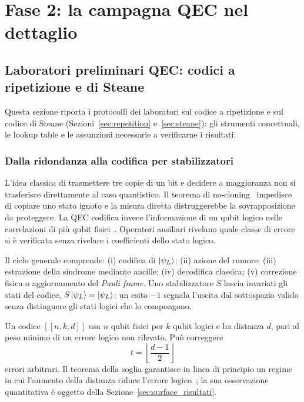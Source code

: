 \chapter{Fase 2: la campagna QEC nel dettaglio}
\captionsetup[figure]{font=small,labelfont=bf}
\label{app:fase2}

\section{Laboratori preliminari QEC: codici a ripetizione e di Steane}
\label{app:laboratori_qec}
\begin{onehalfspace}

Questa sezione riporta i protocolli dei laboratori sul codice a ripetizione e
sul codice di Steane (Sezioni~\ref{sec:repetition} e~\ref{sec:steane}): gli
strumenti concettuali, le lookup table e le assunzioni necessarie a verificarne
i risultati.

\subsection{Dalla ridondanza alla codifica per stabilizzatori}
\label{app:qec_richiami}

L'idea classica di trasmettere tre copie di un bit e decidere a maggioranza
non si trasferisce direttamente al caso quantistico. Il teorema di
no-cloning~\cite{wootters1982} impedisce di copiare uno stato ignoto e la
misura diretta distruggerebbe la sovrapposizione da proteggere. La
\ac{QEC} codifica invece l'informazione di un qubit logico nelle
correlazioni di più qubit fisici~\cite{shorcorrection1995,steane1996,roffe2019}.
Operatori ausiliari rivelano quale classe di errore si è verificata senza
rivelare i coefficienti dello stato logico.

Il ciclo generale comprende: (i) codifica di $\ket{\psi_L}$; (ii) azione
del rumore; (iii) estrazione della sindrome mediante ancille; (iv)
decodifica classica; (v) correzione fisica o aggiornamento del \emph{Pauli
frame}. Uno stabilizzatore $S$ lascia invariati gli stati del codice,
$S\ket{\psi_L}=\ket{\psi_L}$: un esito $-1$ segnala l'uscita dal
sottospazio valido senza distinguere gli stati logici che lo compongono.

Un codice $[[n,k,d]]$ usa $n$ qubit fisici per $k$ qubit logici e ha
distanza $d$, pari al peso minimo di un errore logico non rilevato. Può
correggere
\begin{equation}
 t=\left\lfloor\frac{d-1}{2}\right\rfloor
 \label{eq:distanza_t}
\end{equation}
errori arbitrari. Il teorema della soglia garantisce in linea di principio
un regime in cui l'aumento della distanza riduce l'errore
logico~\cite{aharonov1997fault}; la sua osservazione quantitativa è oggetto
della Sezione~\ref{sec:surface_risultati}.


\end{onehalfspace}
